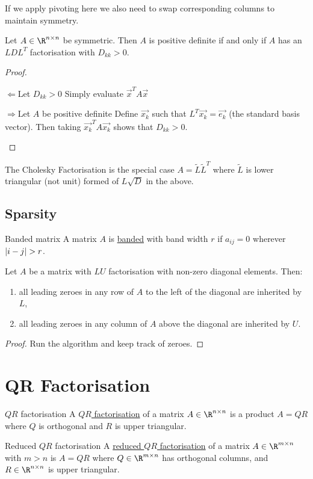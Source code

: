 \documentclass[../Main.tex]{subfiles}
\begin{document}
If we apply pivoting here we also need to swap corresponding columns to maintain symmetry.
\begin{proposition}
    Let $A \in \R^{n \times n}$ be symmetric. Then $A$ is positive definite if and only if $A$ has an $LDL^T$ factorisation with $D_{kk} > 0$.
    \label{propDiagPosDef}
\end{proposition}
\begin{proof}
    \begin{proofdirection}{$\Leftarrow$}{Let $D_{kk} > 0$}
        Simply evaluate $\vec{x}^T A \vec{x}$
    \end{proofdirection}
    \begin{proofdirection}{$\Rightarrow$}{Let $A$ be positive definite}
        Define $\vec{x_k}$ such that $L^T \vec{x_{k}} = \vec{e_k}$ (the standard basis vector). Then taking $\vec{x_k}^T A \vec{x_k}$ shows that $D_{kk} > 0$.
    \end{proofdirection}
\end{proof}
The Cholesky Factorisation is the special case $A = \tilde{L}\tilde{L}^T$ where $\tilde{L}$ is lower triangular (not unit) formed of $L\sqrt{D}$ in the above.
\subsection{Sparsity}
\begin{definition}{Banded matrix}
    A matrix $A$ is \underline{banded} with band width $r$ if $a_{ij} = 0$ wherever $\left|i-j\right| > r$.
\end{definition}
\begin{theorem}
    Let $A$ be a matrix with $LU$ factorisation with non-zero diagonal elements. Then:
    \begin{enumerate}
        \item all leading zeroes in any row of $A$ to the left of the diagonal are inherited by $L$,
        \item all leading zeroes in any column of $A$ above the diagonal are inherited by $U$.
    \end{enumerate}
    \label{thmBandedLU}
\end{theorem}
\begin{proof}
    Run the algorithm and keep track of zeroes.
\end{proof}
\section{QR Factorisation}
\begin{definition}{$QR$ factorisation}
    A \underline{$QR$ factorisation} of a matrix $A \in \R^{n \times n}$ is a product $A = QR$ where $Q$ is orthogonal and $R$ is upper triangular.
\end{definition}
\begin{definition}{Reduced $QR$ factorisation}
    A \underline{reduced $QR$ factorisation} of a matrix $A \in \R^{m \times n}$ with $m > n$ is $A = QR$ where $Q \in \R^{m \times n}$ has orthogonal columns, and $R \in \R^{n \times n}$ is upper triangular.
\end{definition}
\end{document}
